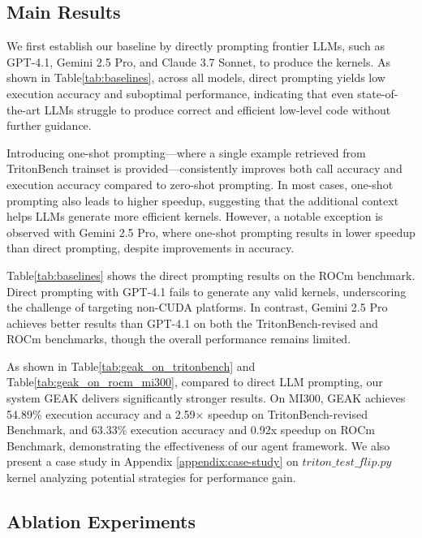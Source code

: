 

\subsection{Main Results}
We first establish our baseline by directly prompting frontier LLMs, such as GPT-4.1, Gemini 2.5 Pro, and Claude 3.7 Sonnet, to produce the kernels. As shown in Table\ref{tab:baselines}, across all models, direct prompting yields low execution accuracy and suboptimal performance, indicating that even state-of-the-art LLMs struggle to produce correct and efficient low-level code without further guidance.

Introducing one-shot prompting—where a single example retrieved from TritonBench trainset is provided—consistently improves both call accuracy and execution accuracy compared to zero-shot prompting. In most cases, one-shot prompting also leads to higher speedup, suggesting that the additional context helps LLMs generate more efficient kernels. However, a notable exception is observed with Gemini 2.5 Pro, where one-shot prompting results in lower speedup than direct prompting, despite improvements in accuracy.

Table\ref{tab:baselines} shows the direct prompting results on the ROCm benchmark. Direct prompting with GPT-4.1 fails to generate any valid kernels, underscoring the challenge of targeting non-CUDA platforms. In contrast, Gemini 2.5 Pro achieves better results than GPT-4.1 on both the TritonBench-revised and ROCm benchmarks, though the overall performance remains limited.

As shown in Table\ref{tab:geak_on_tritonbench} and Table\ref{tab:geak_on_rocm_mi300}, compared to direct LLM prompting, our system GEAK delivers significantly stronger results. On MI300, GEAK achieves 54.89\% execution accuracy and a 2.59× speedup on TritonBench-revised Benchmark, and 63.33\% execution accuracy and 0.92x speedup on ROCm Benchmark, demonstrating the effectiveness of our agent framework. We also present a case study in Appendix \ref{appendix:case-study} on $triton\_test\_flip.py$ kernel analyzing potential strategies for performance gain.





\subsection{Ablation Experiments}

